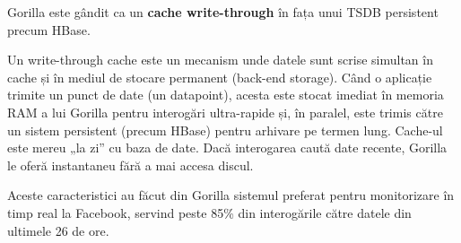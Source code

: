 Gorilla este gândit ca un \textbf{cache write-through} în fața unui TSDB persistent precum HBase. 

Un write-through cache este un mecanism unde datele sunt scrise simultan în cache și în mediul de stocare permanent (back-end storage).
Când o aplicație trimite un punct de date (un datapoint), acesta este stocat imediat în memoria RAM a lui Gorilla pentru interogări ultra-rapide și, în paralel, este trimis către un sistem persistent (precum HBase) pentru arhivare pe termen lung.
Cache-ul este mereu „la zi” cu baza de date. Dacă interogarea caută date recente, Gorilla le oferă instantaneu fără a mai accesa discul.

Aceste caracteristici au făcut din Gorilla sistemul preferat pentru monitorizare în timp real la Facebook, servind peste 85\% din interogările către datele din ultimele 26 de ore.